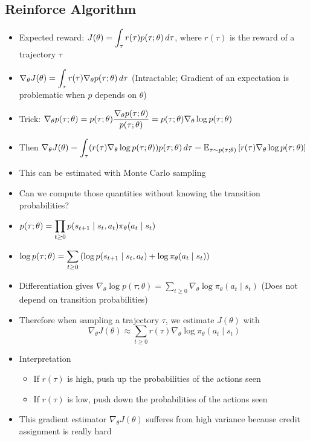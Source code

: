 \subsection{Reinforce Algorithm}
\begin{itemize}
	\item Expected reward: $J(\theta) = \displaystyle\int_\tau r(\tau)p(\tau; \theta) \, d\tau$, where $r(\tau)$ is the reward of a trajectory $\tau$
	\item $\nabla_\theta J(\theta) = \displaystyle\int_\tau r(\tau)\nabla_\theta p(\tau; \theta) \, d\tau$ (Intractable; Gradient of an expectation is problematic when $p$ depends on $\theta$)
	\item Trick: $\nabla_\theta p(\tau; \theta) = p(\tau;\theta)\displaystyle \frac{\nabla_\theta p(\tau; \theta)}{p(\tau;\theta)} = p(\tau;\theta) \nabla_\theta \log p(\tau;\theta)$
	\item Then $\nabla_\theta J(\theta) = \displaystyle\int_\tau (r(\tau)\nabla_\theta \log p(\tau;\theta)) p(\tau;\theta)\,d\tau = \mathbb{E}_{\tau\sim p(\tau;\theta)}\left[r(\tau)\nabla_\theta \log p(\tau;\theta)\right]$
	\item This can be estimated with Monte Carlo sampling
	\item Can we compute those quantities without knowing the transition probabilities?
	\item $p(\tau;\theta) = \displaystyle\prod_{t\geq 0} p(s_{t+1}\mid s_t, a_t) \pi_{\theta}(a_t\mid s_t)$
	\item $\log p(\tau;\theta) = \displaystyle\sum_{t\geq 0} \left(\log p(s_{t+1}\mid s_t, a_t) + \log \pi_{\theta}(a_t\mid s_t)\right)$ \item Differentiation gives $\nabla_\theta \log p(\tau;\theta) = \sum_{t\geq 0} \nabla_\theta \log \pi_{\theta}(a_t\mid s_t)$ (Does not depend on transition probabilities)
	\item Therefore when sampling a trajectory $\tau$, we estimate $J(\theta)$ with
	$$\nabla_\theta J(\theta) \approx \sum_{t\geq 0} r(\tau)\nabla_\theta \log \pi_{\theta}(a_t\mid s_t)$$
	\item Interpretation
	\begin{itemize}
		\item If $r(\tau)$ is high, push up the probabilities of the actions seen
		\item If $r(\tau)$ is low, push down the probabilities of the actions seen
	\end{itemize}
	\item This gradient estimator $\nabla_\theta J(\theta)$ sufferes from high variance because credit assignment is really hard

\end{itemize}
